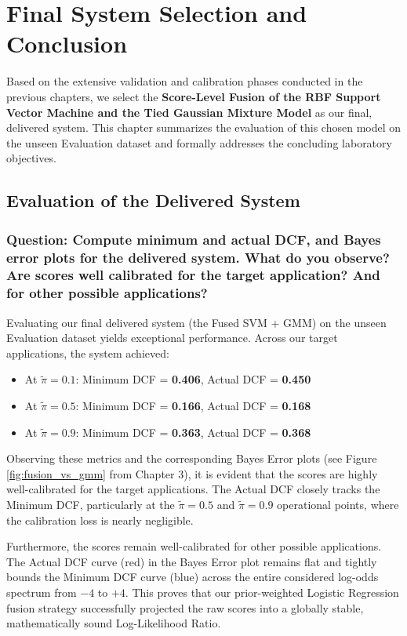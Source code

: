 \chapter{Final System Selection and Conclusion}
\label{chap:conclusion}

Based on the extensive validation and calibration phases conducted in the previous chapters, we select the \textbf{Score-Level Fusion of the RBF Support Vector Machine and the Tied Gaussian Mixture Model} as our final, delivered system. This chapter summarizes the evaluation of this chosen model on the unseen Evaluation dataset and formally addresses the concluding laboratory objectives.

\section{Evaluation of the Delivered System}

\subsection*{Question: Compute minimum and actual DCF, and Bayes error plots for the delivered system. What do you observe? Are scores well calibrated for the target application? And for other possible applications?}

Evaluating our final delivered system (the Fused SVM + GMM) on the unseen Evaluation dataset yields exceptional performance. Across our target applications, the system achieved:
\begin{itemize}
    \item At $\tilde{\pi}=0.1$: Minimum DCF = \textbf{0.406}, Actual DCF = \textbf{0.450}
    \item At $\tilde{\pi}=0.5$: Minimum DCF = \textbf{0.166}, Actual DCF = \textbf{0.168}
    \item At $\tilde{\pi}=0.9$: Minimum DCF = \textbf{0.363}, Actual DCF = \textbf{0.368}
\end{itemize}

Observing these metrics and the corresponding Bayes Error plots (see Figure \ref{fig:fusion_vs_gmm} from Chapter 3), it is evident that the scores are highly well-calibrated for the target applications. The Actual DCF closely tracks the Minimum DCF, particularly at the $\tilde{\pi}=0.5$ and $\tilde{\pi}=0.9$ operational points, where the calibration loss is nearly negligible. 

Furthermore, the scores remain well-calibrated for other possible applications. The Actual DCF curve (red) in the Bayes Error plot remains flat and tightly bounds the Minimum DCF curve (blue) across the entire considered log-odds spectrum from $-4$ to $+4$. This proves that our prior-weighted Logistic Regression fusion strategy successfully projected the raw scores into a globally stable, mathematically sound Log-Likelihood Ratio.

